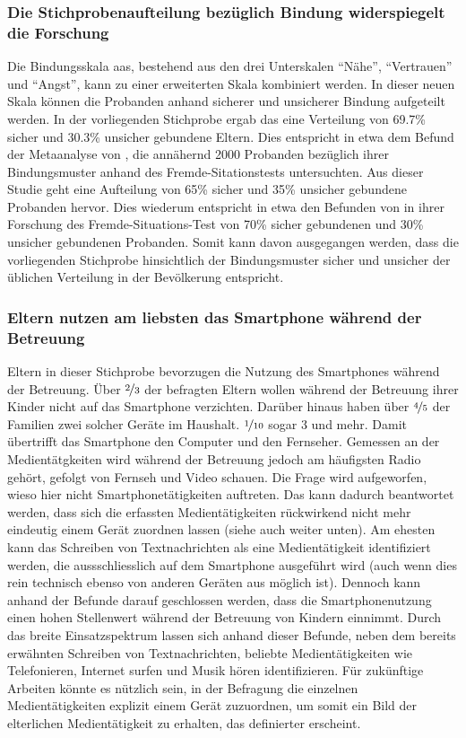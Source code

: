 \subsubsection{Die Stichprobenaufteilung bezüglich Bindung widerspiegelt die Forschung}
Die Bindungsskala \acrfull{aas}, bestehend aus den drei Unterskalen \enquote{Nähe}, \enquote{Vertrauen} und \enquote{Angst}, kann zu einer erweiterten Skala kombiniert werden. In dieser neuen Skala können die Probanden anhand sicherer und unsicherer Bindung aufgeteilt werden. In der vorliegenden Stichprobe ergab das eine Verteilung von 
69.7\% sicher und 30.3\% unsicher gebundene Eltern. Dies entspricht in etwa dem Befund der Metaanalyse von , die annähernd 2000  Probanden bezüglich ihrer Bindungsmuster anhand des Fremde-Sitationstests untersuchten. Aus dieser Studie geht eine Aufteilung von 65\% sicher und 35\% unsicher gebundene Probanden hervor. Dies wiederum entspricht in etwa den Befunden von  in ihrer Forschung des Fremde-Situations-Test von 70\% sicher gebundenen und 30\% unsicher gebundenen Probanden. Somit kann davon ausgegangen werden, dass die vorliegenden Stichprobe hinsichtlich der Bindungsmuster sicher und unsicher der üblichen Verteilung in der Bevölkerung entspricht.

\subsubsection{Eltern nutzen am liebsten das Smartphone während der Betreuung}
Eltern in dieser Stichprobe bevorzugen die Nutzung des Smartphones während der Betreuung. Über $\nicefrac{2}{3}$ der befragten Eltern wollen während der Betreuung ihrer Kinder nicht auf das Smartphone verzichten. Darüber hinaus haben über $\nicefrac{4}{5}$ der Familien zwei solcher Geräte im Haushalt. $\nicefrac{1}{10}$ sogar 3 und mehr. Damit übertrifft das Smartphone den Computer und den Fernseher. Gemessen an der Medientätgkeiten wird während der Betreuung jedoch am häufigsten Radio gehört, gefolgt von Fernseh und Video schauen. Die Frage wird aufgeworfen, wieso hier nicht Smartphonetätigkeiten auftreten. Das kann dadurch beantwortet werden, dass sich die erfassten Medientätigkeiten rückwirkend nicht mehr eindeutig einem Gerät zuordnen lassen (siehe auch \textit{} weiter unten). Am ehesten kann das Schreiben von Textnachrichten als eine Medientätigkeit identifiziert werden, die aussschliesslich auf dem Smartphone ausgeführt wird (auch wenn dies rein technisch ebenso von anderen Geräten aus möglich ist). Dennoch kann anhand der Befunde darauf geschlossen werden, dass die Smartphonenutzung einen hohen Stellenwert während der Betreuung von Kindern einnimmt. Durch das breite Einsatzspektrum lassen sich anhand dieser Befunde, neben dem bereits erwähnten Schreiben von Textnachrichten, beliebte Medientätigkeiten wie Telefonieren, Internet surfen und Musik hören identifizieren. Für zukünftige Arbeiten könnte es nützlich sein, in der Befragung die einzelnen Medientätigkeiten explizit einem Gerät zuzuordnen, um somit ein Bild der elterlichen Medientätigkeit zu erhalten, das definierter erscheint.  

